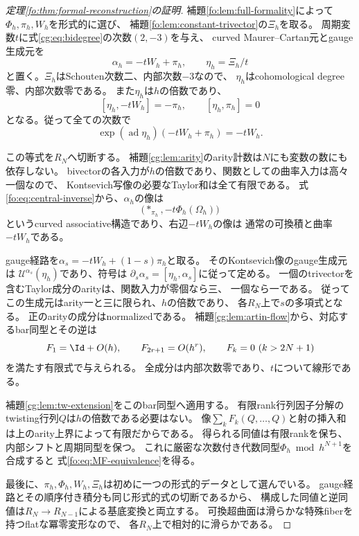 \begin{proof}[定理\ref{fo:thm:formal-reconstruction}の証明]
補題\ref{fo:lem:full-formality}によって$\Phi_h,\pi_h,W_h$を形式的に選び、
補題\ref{fo:lem:constant-trivector}の$\Xi_h$を取る。
周期変数$t$に式\eqref{cg:eq:bidegree}の次数$(2,-3)$を与え、
curved Maurer--Cartan元とgauge生成元を
\[
 \alpha_h=-tW_h+\pi_h,\qquad \eta_h=\Xi_h/t
\]
と置く。$\Xi_h$はSchouten次数二、内部次数$-3$なので、
$\eta_h$はcohomological degree零、内部次数零である。
また$\eta_h$は$h$の倍数であり、
\[
 [\eta_h,-tW_h]=-\pi_h,\qquad [\eta_h,\pi_h]=0
\]
となる。従って全ての次数で
\begin{equation}\label{fo:eq:all-order-gauge}
 \boxed{\quad
 \exp(\operatorname{ad}\eta_h)(-tW_h+\pi_h)=-tW_h.
 \quad}
\end{equation}

この等式を$R_N$へ切断する。
補題\ref{cg:lem:arity}のarity計数は$N$にも変数の数にも依存しない。
bivectorの各入力が$h$の倍数であり、関数としての曲率入力は高々一個なので、
Kontsevich写像の必要なTaylor和は全て有限である。
式\eqref{fo:eq:central-inverse}から、$\alpha_h$の像は
\[
 \bigl(*_{\pi_h},-t\Phi_h(\Omega_h)\bigr)
\]
というcurved associative構造であり、右辺$-tW_h$の像は
通常の可換積と曲率$-tW_h$である。

gauge経路を$\alpha_s=-tW_h+(1-s)\pi_h$と取る。
そのKontsevich像のgauge生成元は
$\mathcal U^{\alpha_s}(\eta_h)$であり、符号は
$\partial_s\alpha_s=[\eta_h,\alpha_s]$に従って定める。
一個のtrivectorを含むTaylor成分のarityは、関数入力が零個なら三、
一個なら一である。
従ってこの生成元はarity一と三に限られ、$h$の倍数であり、
各$R_N$上で$s$の多項式となる。
正のarityの成分はnormalizedである。
補題\ref{cg:lem:artin-flow}から、対応するbar同型とその逆は
\[
 F_1=\Id+O(h),\qquad
 F_{2r+1}=O(h^r),\qquad F_k=0\ (k>2N+1)
\]
を満たす有限式で与えられる。
全成分は内部次数零であり、$t$について線形である。

補題\ref{cg:lem:tw-extension}をこのbar同型へ適用する。
有限rank行列因子分解のtwisting行列$Q$は$h$の倍数である必要はない。
像$\sum_kF_k(Q,\ldots,Q)$と射の挿入和は上のarity上界によって有限だからである。
得られる同値は有限rankを保ち、内部シフトと周期同型を保つ。
これに厳密な次数付き代数同型$\Phi_h\bmod h^{N+1}$を合成すると
式\eqref{fo:eq:MF-equivalence}を得る。

最後に、$\pi_h,\Phi_h,W_h,\Xi_h$は初めに一つの形式的データとして選んでいる。
gauge経路とその順序付き積分も同じ形式的式の切断であるから、
構成した同値と逆同値は$R_N\to R_{N-1}$による基底変換と両立する。
可換超曲面は滑らかな特殊fiberを持つflatな冪零変形なので、
各$R_N$上で相対的に滑らかである。
\end{proof}

